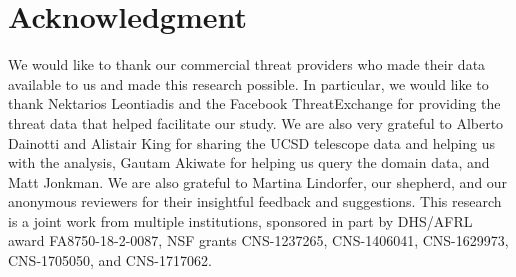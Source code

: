 \section{Acknowledgment}

We would like to thank our commercial threat providers who made their
data available to us and made this research possible. In particular,
we would like to thank Nektarios Leontiadis and the Facebook ThreatExchange
for providing the threat data that helped facilitate our study.
We are also very grateful to Alberto
Dainotti and Alistair King for sharing the UCSD telescope data and
helping us with the analysis, Gautam Akiwate for helping us query the
domain data, and Matt Jonkman.  We are
also grateful to Martina Lindorfer, our shepherd, and our anonymous
reviewers for their insightful feedback and suggestions.  This
research is a joint work from multiple institutions, sponsored in part
by DHS/AFRL award FA8750-18-2-0087, NSF grants CNS-1237265,
CNS-1406041, CNS-1629973, CNS-1705050, and CNS-1717062. %
